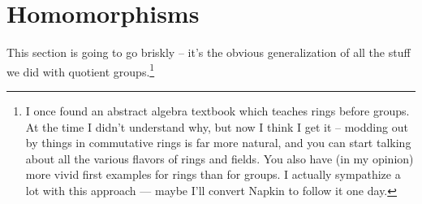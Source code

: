 %

\section{Homomorphisms}
This section is going to go briskly --
it's the obvious generalization of all the stuff
we did with quotient groups.\footnote{I once found an
	abstract algebra textbook which teaches rings before groups.
	At the time I didn't understand why,
	but now I think I get it -- modding out by things in
	commutative rings is far more natural, and you can start talking
	about all the various flavors of rings and fields.
	You also have (in my opinion) more vivid first examples
	for rings than for groups.
	I actually sympathize a lot with this approach --- maybe I'll convert
	Napkin to follow it one day.}

